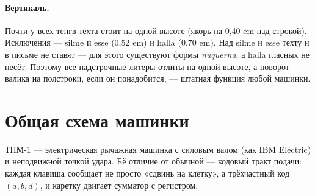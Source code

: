 \documentclass[11pt,a4paper]{article}
\begin{document}
\paragraph{Вертикаль.} Почти у всех тенгв техта стоит на одной высоте (якорь на 0,40 em над строкой). Исключения — silme и esse (0,52 em) и halla (0,70 em). Над silme и esse техту и в письме не ставят — для этого существуют формы \emph{nuquerna}, а halla гласных не несёт. Поэтому все надстрочные литеры отлиты на одной высоте, а поворот валика на полстроки, если он понадобится, — штатная функция любой машинки.

\section{Общая схема машинки}

ТПМ-1 — электрическая рычажная машинка с силовым валом (как IBM Electric) и неподвижной точкой удара. Её отличие от обычной — кодовый тракт подачи: каждая клавиша сообщает не просто «сдвинь на клетку», а трёхчастный код $(a, b, d)$, и каретку двигает сумматор с регистром.
\end{document}
